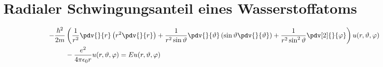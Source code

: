 %
%
%
\section{Radialer Schwingungsanteil eines Wasserstoffatoms
\label{laguerre:section:radial_h_atom}}

\begin{align}
    \nonumber
    - \frac{\hbar^2}{2m} 
    &
    \left( 
        \frac{1}{r^2} \pdv{}{r}
        \left( r^2 \pdv{}{r} \right)
        +
        \frac{1}{r^2 \sin \vartheta} \pdv{}{\vartheta}
        \left( \sin \vartheta \pdv{}{\vartheta} \right)
        +
        \frac{1}{r^2 \sin^2 \vartheta} \pdv[2]{}{\varphi}
    \right)
    u(r, \vartheta, \varphi)
    \\
    & -
    \frac{e^2}{4 \pi \epsilon_0 r} u(r, \vartheta, \varphi)
    =
    E u(r, \vartheta, \varphi)
    \label{laguerre:pdg_h_atom}
\end{align}
